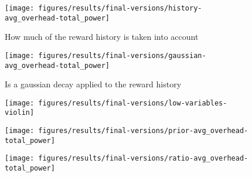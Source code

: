 \documentclass[10pt, conference, compsocconf]{IEEEtran}
\begin{document}
%
\begin{figure}[H]
\texttt{[image: figures/results/final-versions/history-avg\_overhead-total\_power]}
  \caption{How much of the reward history is taken into account}
  \label{fig:history}
\end{figure}
%
\begin{figure}[H]
\texttt{[image: figures/results/final-versions/gaussian-avg\_overhead-total\_power]}
  \caption{Is a gaussian decay applied to the reward history}
  \label{fig:gaussian}
\end{figure}
%
\begin{figure}[H]\texttt{[image: figures/results/final-versions/low-variables-violin]}\end{figure}
\begin{figure}[H]\texttt{[image: figures/results/final-versions/prior-avg\_overhead-total\_power]}\end{figure}
\begin{figure}[H]\texttt{[image: figures/results/final-versions/ratio-avg\_overhead-total\_power]}\end{figure}
\end{document}
